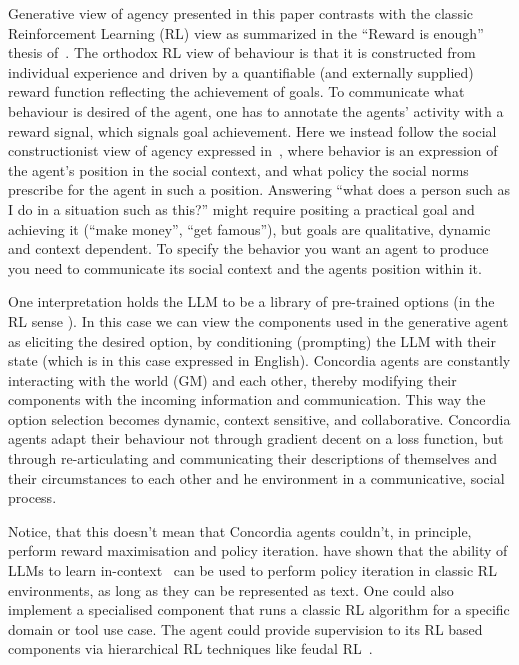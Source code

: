 \documentclass[11pt, a4paper, logo, twocolumn, internal, copyright, numbering]{googledeepmind}
\begin{document}
Generative view of agency presented in this paper contrasts with the classic Reinforcement Learning (RL) view as summarized in the ``Reward is enough'' thesis of~\cite{silver2021rewardisenough}. The orthodox RL view of behaviour is that it is constructed from individual experience and driven by a quantifiable (and externally supplied) reward function reflecting the achievement of goals. To communicate what behaviour is desired of the agent, one has to annotate the agents' activity with a reward signal, which signals goal achievement.
Here we instead follow the social constructionist view of agency expressed in~\cite{march2011logic}, where behavior is an expression of the agent's position in the social context, and what policy the social norms prescribe for the agent in such a position. Answering ``what does a person such as I do in a situation such as this?'' might require positing a practical goal and achieving it (``make money'', ``get famous''), but goals are qualitative, dynamic and context dependent. To specify the behavior you want an agent to produce you need to communicate  its social context and the agents position within it.

One interpretation holds the LLM to be a library of pre-trained options (in the RL sense \citep{sutton1999between}). In this case we can view the components used in the generative agent as eliciting the desired option, by conditioning (prompting) the LLM with their state (which is in this case expressed in English). Concordia agents are constantly interacting with the world (GM) and each other, thereby modifying their components with the incoming information and communication. This way the option selection becomes dynamic, context sensitive, and collaborative.  Concordia agents adapt their behaviour not through gradient decent on a loss function, but through re-articulating and communicating their descriptions of themselves and their circumstances to each other and he environment in a communicative, social process. 

Notice, that this doesn't mean that Concordia agents couldn't, in principle, perform reward maximisation and policy iteration. \cite{brooks2023large} have shown that the ability of LLMs to learn in-context~\citep{brown2020language} can be used to perform policy iteration in classic RL environments, as long as they can be represented as text. One could also implement a specialised component that runs a classic RL algorithm for a specific domain or tool use case. The agent could provide supervision to its RL based components via hierarchical RL techniques like feudal RL~\citep{dayan1992feudal,vezhnevets2017feudal}.
\end{document}
